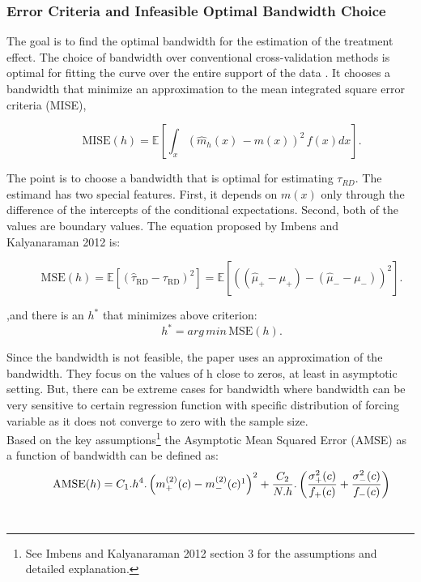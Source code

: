 \documentclass[fleqn]{article}
\begin{document}
    \subsubsection{Error Criteria and Infeasible Optimal Bandwidth Choice}

    The goal is to find the optimal bandwidth for the estimation of the treatment effect. The choice of bandwidth over conventional cross-validation methods is optimal for fitting the curve over the entire support of the data \footnotemark[1]. It chooses a bandwidth that minimize an approximation to the mean integrated square error criteria (MISE), 

    \begin{equation*}
        \qquad \mathrm{MISE}(h)= \mathbb{E}\left[\int_x(\hat{m}_h(x) \, -m(x))^2 \, f(x) dx\right].
    \end{equation*}

    The point is to choose a bandwidth that is optimal for estimating $\tau_{RD}$. The estimand has two special features. First, it depends on $m(x)$ only through the difference of the intercepts of the conditional expectations. Second, both of the values are boundary values. The equation proposed by Imbens and Kalyanaraman 2012\cite{imbens2012optimal} is:

    \begin{equation}
        \qquad \mathrm{MSE}(h) = \mathbb{E} \left[ \left( \hat{\tau}_{\mathrm{RD}} - \tau_{\mathrm{RD}} \right)^2 \right] = \mathbb{E} \left[ \left( \left(\hat{\mu}_{+} - \mu_{+}\right) - \left(\hat{\mu}_{-} - \mu_{-}\right) \right)^2 \right].
    \end{equation}

    ,and there is an $h^*$ that minimizes above criterion:
    \begin{equation}
        \qquad h^* = arg\,min\,\text{MSE}(h).
    \end{equation}
    
    Since the bandwidth is not feasible, the paper uses an approximation of the bandwidth. They focus on the values of h close to zeros, at least in asymptotic setting. But, there can be extreme cases for bandwidth where bandwidth can be very sensitive to certain regression function with specific distribution of forcing variable as it does not converge to zero with the sample size. \\

    Based on the key assumptions\footnote{See Imbens and Kalyanaraman 2012\cite{imbens2012optimal} section 3 for the assumptions and detailed explanation.} the Asymptotic Mean Squared Error (AMSE) as a function of bandwidth can be defined as:\\
    \begin{equation}
        \qquad \text{AMSE}(h) = C_1.h^4.\left(m^{(2)}_+(c) - m^{(2)}_-(c)\footnotemark \right)^2 + \frac{C_2}{N.h} .\left( \frac{\sigma^{2}_+(c)}{f_+(c)} + \frac{\sigma^{2}_-(c)}{f_-(c)} \right)
    \end{equation} \\
\end{document}
